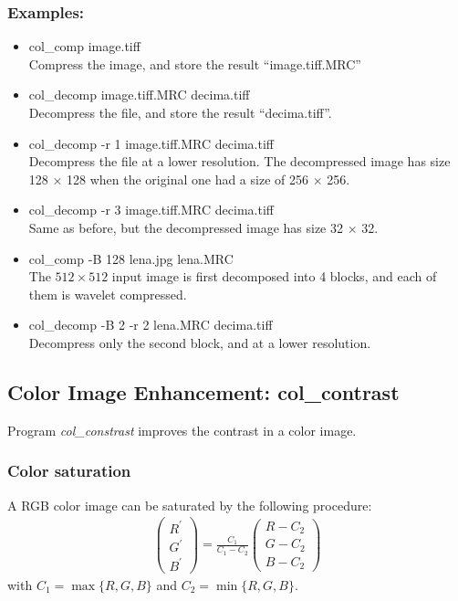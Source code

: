 \subsubsection*{Examples:}
\begin{itemize}
\baselineskip=0.4truecm
\item col\_comp image.tiff \\
Compress the image, and store the result ``image.tiff.MRC''
\item col\_decomp image.tiff.MRC  decima.tiff\\
Decompress the file, and store the result ``decima.tiff''. 
\item col\_decomp -r 1 image.tiff.MRC  decima.tiff \\
Decompress the file at a lower resolution. The decompressed image
has  size 128 $\times$ 128 when the original one had a size of 256 $\times$
256.
\item col\_decomp  -r 3 image.tiff.MRC  decima.tiff \\
Same as before, but the  decompressed image has size 32 $\times$ 32.
\item col\_comp -B 128 lena.jpg  lena.MRC \\
The $512 \times 
512$ input image is first decomposed into 4 blocks, and each of them
is wavelet compressed.
\item col\_decomp  -B 2 -r 2 lena.MRC  decima.tiff \\
Decompress only the second block, and at a lower resolution.
\end{itemize}


\newpage
\subsection{Color Image Enhancement: col\_contrast}
Program {\em col\_constrast} improves the contrast in a color image.

\subsubsection*{Color saturation}

A RGB color image can be saturated by the following procedure:
\begin{eqnarray}
\left( \begin{array}{c}
R^{'}\\
G^{'}\\
B^{'}
\end{array}\right)  = \frac{C_{1}}{C_{1}-C_{2}} \left( \begin{array}{c}
R-C_{2}\\
G-C_{2}\\
B-C_{2}
\end{array}
\right)
\end{eqnarray}
with $C_1 = \max\{R,G,B\}$ and $C_2 = \min\{R,G,B\}$.

